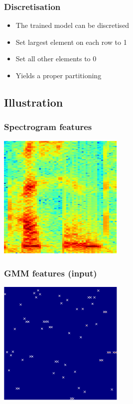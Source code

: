 \documentclass[british]{beamer}
\begin{document}
  \begin{frame}
   \frametitle{Discretisation}
   
   \begin{itemize}
    \item The trained model can be discretised
    \item Set largest element on each row to 1
    \item Set all other elements to 0
    \item Yields a proper partitioning
   \end{itemize}
  \end{frame}

  
  \subsection{Illustration}
  
  \begin{frame}
    \frametitle{Spectrogram features}
   \centering
   \includegraphics[width=6cm]{../report/data/spectrum-speaker-1-crop}
  \end{frame}
  
  \begin{frame}
    \frametitle{GMM features (input)}
   \centering
   \includegraphics[width=6cm]{../report/data/gmm-posteriorgrams-speaker-1-crop}
  \end{frame}
  
\end{document}
